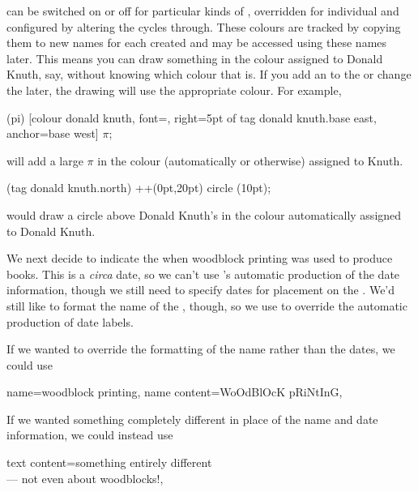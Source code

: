 \documentclass[10pt,british,a4paper]{ltxdoc}
\newcommand*\pkg[1]{\textpkg{#1}}
\begin{document}
 can be switched on or off for particular kinds of \elementslabelname{}, overridden for individual \elementslabelname{} and configured by altering the \collistslabelname{} \pkg{chronos} cycles through.
These colours are tracked by copying them to new names for each \elementlabelname{} created and may be accessed using these names later.
This means you can draw something in the colour assigned to Donald Knuth, say, without knowing which colour that is.
If you add an \elementlabelname{} to the  or change the \collistslabelname{} later, the drawing will use the appropriate colour.
For example,
\begin{chronoscode}
  \node (pi) [colour donald knuth, font=\Huge, right=5pt of tag donald knuth.base east, anchor=base west] {$\pi$};
\end{chronoscode}
will add a large $\pi$ in the colour (automatically or otherwise) assigned to Knuth.
\begin{chronoscode}
   (tag donald knuth.north) ++(0pt,20pt) circle (10pt);
\end{chronoscode}
would draw a circle above Donald Knuth's  in the colour automatically assigned to Donald Knuth.

We next decide to indicate the  when woodblock printing was used to produce books.
This is a \emph{circa} date, so we can't use \pkg{chronos}'s automatic production of the date information, though we still need to specify dates for placement on the .
We'd still like \pkg{chronos} to format the name of the , though, so we use  to override the automatic production of date labels.
\begin{chronoscode}
\end{chronoscode}
If we wanted to override the formatting of the name rather than the dates, we could use
\begin{chronoscode}
    name=woodblock printing,
    name content={WoOdBlOcK pRiNtInG},
\end{chronoscode}
If we wanted something completely different in place of the name and date information, we could instead use
\begin{chronoscode}
    text content={something entirely different\\--- not even about woodblocks!},  
\end{chronoscode}
\end{document}
